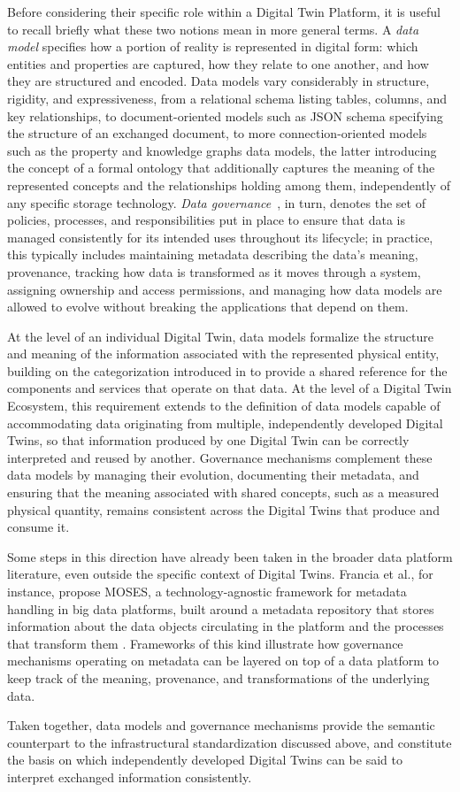 Before considering their specific role within a Digital Twin Platform, it is useful to recall briefly what these two notions mean in more general terms. A \textit{data model} specifies how a portion of reality is represented in digital form: which entities and properties are captured, how they relate to one another, and how they are structured and encoded. Data models vary considerably in structure, rigidity, and expressiveness, from a relational schema listing tables, columns, and key relationships, to document-oriented models such as JSON schema specifying the structure of an exchanged document, to more connection-oriented models such as the property and knowledge graphs data models, the latter introducing the concept of a formal ontology that additionally captures the meaning of the represented concepts and the relationships holding among them, independently of any specific storage technology. \textit{Data governance}~\cite{Khatri2010}, in turn, denotes the set of policies, processes, and responsibilities put in place to ensure that data is managed consistently for its intended uses throughout its lifecycle; in practice, this typically includes maintaining metadata describing the data's meaning, provenance, tracking how data is transformed as it moves through a system, assigning ownership and access permissions, and managing how data models are allowed to evolve without breaking the applications that depend on them.

At the level of an individual Digital Twin, data models formalize the structure and meaning of the information associated with the represented physical entity, building on the categorization introduced in  to provide a shared reference for the components and services that operate on that data. At the level of a Digital Twin Ecosystem, this requirement extends to the definition of data models capable of accommodating data originating from multiple, independently developed Digital Twins, so that information produced by one Digital Twin can be correctly interpreted and reused by another. Governance mechanisms complement these data models by managing their evolution, documenting their metadata, and ensuring that the meaning associated with shared concepts, such as a measured physical quantity, remains consistent across the Digital Twins that produce and consume it.

Some steps in this direction have already been taken in the broader data platform literature, even outside the specific context of Digital Twins. Francia et al., for instance, propose MOSES, a technology-agnostic framework for metadata handling in big data platforms, built around a metadata repository that stores information about the data objects circulating in the platform and the processes that transform them \cite{francia2021moses}. Frameworks of this kind illustrate how governance mechanisms operating on metadata can be layered on top of a data platform to keep track of the meaning, provenance, and transformations of the underlying data.

Taken together, data models and governance mechanisms provide the semantic counterpart to the infrastructural standardization discussed above, and constitute the basis on which independently developed Digital Twins can be said to interpret exchanged information consistently.

